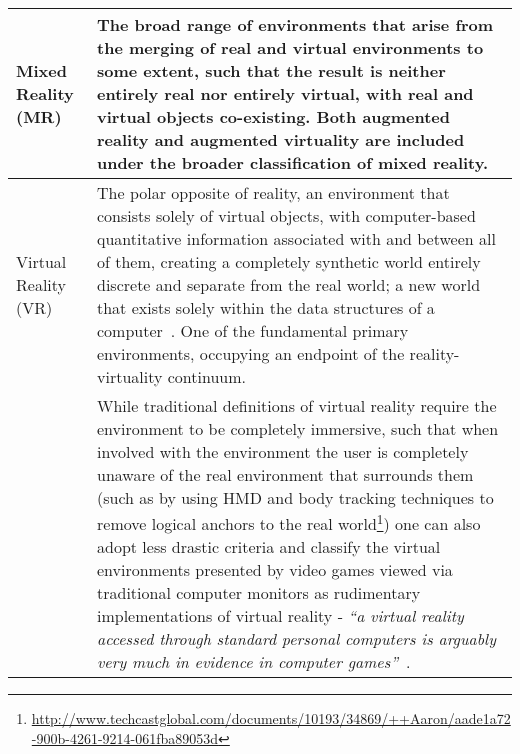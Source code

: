 \begin{center}
\begin{longtable}{ l p{10cm} }




Mixed Reality (MR) & The broad range of environments that arise from the merging of real and virtual environments to some extent, such that the result is neither entirely real nor entirely virtual, with real and virtual objects co-existing. Both augmented reality and augmented virtuality are included under the broader classification of mixed reality. \\

\hline
		

Virtual Reality (VR) & The polar opposite of reality, an environment that consists solely of virtual objects, with computer-based quantitative information associated with and between all of them, creating a completely synthetic world entirely discrete and separate from the real world; a new world that exists solely within the data structures of a computer~\cite{Milgram1999, Want2009}. One of the fundamental primary environments, occupying an endpoint of the reality-virtuality continuum. \\

& While traditional definitions of virtual reality require the environment to be completely immersive, such that when involved with the environment the user is completely unaware of the real environment that surrounds them (such as by using HMD and body tracking techniques to remove logical anchors to the real world\footnote{\url{http://www.techcastglobal.com/documents/10193/34869/++Aaron/aade1a72-900b-4261-9214-061fba89053d}}) one can also adopt less drastic criteria and classify the virtual environments presented by video games viewed via traditional computer monitors as rudimentary implementations of virtual reality - \textit{``a virtual reality accessed through standard personal computers is arguably very much in evidence in computer games''}~\cite{Green2014}. \\
		

\end{longtable}
\end{center}
